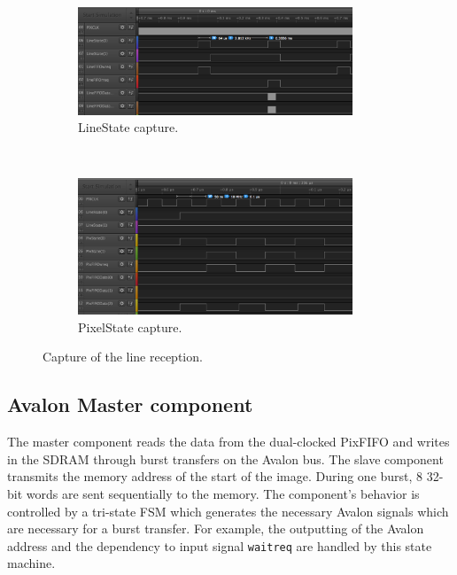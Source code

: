 \documentclass{article}
\begin{document}
\begin{figure}[H]
\centering
\begin{subfigure}[b]{\textwidth}
\centering
\includegraphics[width=0.9\textwidth]{images/camera_interface_capture_line_state.png}
\caption{LineState capture.}
\label{fig:capture_line_state}
\end{subfigure}
~
\begin{subfigure}[b]{\textwidth}
\centering
\includegraphics[width=0.9\textwidth]{images/camera_interface_capture_pixel_state.png}
\caption{PixelState capture.}
\label{fig:capture_pixel_state}
\end{subfigure}
\caption{Capture of the line reception.}
\label{fig:capture_interface_states}
\end{figure}

\subsection{Avalon Master component}

The master component reads the data from the dual-clocked PixFIFO and writes in the SDRAM through burst transfers on the Avalon bus. The slave component transmits the memory address of the start of the image. During one burst, 8 32-bit words are sent sequentially to the memory. The component's behavior is controlled by a tri-state FSM which generates the necessary Avalon signals which are necessary for a burst transfer. For example, the outputting of the Avalon address and the dependency to input signal \verb'waitreq' are handled by this state machine. 
\end{document}
